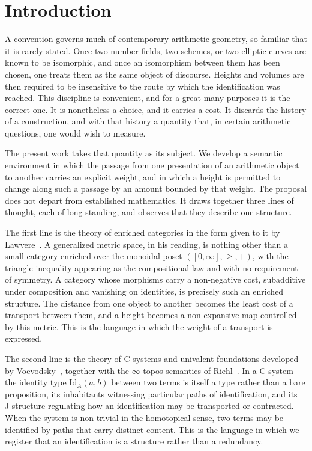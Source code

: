 \documentclass[10pt, reqno]{amsart}
\theoremstyle{plain}
\theoremstyle{definition}
\theoremstyle{plain}
\begin{document}
\tableofcontents

\section{Introduction}\label{sec:intro}

A convention governs much of contemporary arithmetic geometry, so familiar that it is rarely stated. Once two number fields, two schemes, or two elliptic curves are known to be isomorphic, and once an isomorphism between them has been chosen, one treats them as the same object of discourse. Heights and volumes are then required to be insensitive to the route by which the identification was reached. This discipline is convenient, and for a great many purposes it is the correct one. It is nonetheless a choice, and it carries a cost. It discards the history of a construction, and with that history a quantity that, in certain arithmetic questions, one would wish to measure.

The present work takes that quantity as its subject. We develop a semantic environment in which the passage from one presentation of an arithmetic object to another carries an explicit weight, and in which a height is permitted to change along such a passage by an amount bounded by that weight. The proposal does not depart from established mathematics. It draws together three lines of thought, each of long standing, and observes that they describe one structure.

The first line is the theory of enriched categories in the form given to it by Lawvere~\cite{Lawvere1973}. A generalized metric space, in his reading, is nothing other than a small category enriched over the monoidal poset $([0,\infty],\ge,+)$, with the triangle inequality appearing as the compositional law and with no requirement of symmetry. A category whose morphisms carry a non-negative cost, subadditive under composition and vanishing on identities, is precisely such an enriched structure. The distance from one object to another becomes the least cost of a transport between them, and a height becomes a non-expansive map controlled by this metric. This is the language in which the weight of a transport is expressed.

The second line is the theory of C-systems and univalent foundations developed by Voevodsky~\cite{voevodsky2023martin}, together with the $\infty$-topos semantics of Riehl~\cite{Riehl2024}. In a C-system the identity type $\mathrm{Id}_A(a,b)$ between two terms is itself a type rather than a bare proposition, its inhabitants witnessing particular paths of identification, and its J-structure regulating how an identification may be transported or contracted. When the system is non-trivial in the homotopical sense, two terms may be identified by paths that carry distinct content. This is the language in which we register that an identification is a structure rather than a redundancy.
\end{document}
